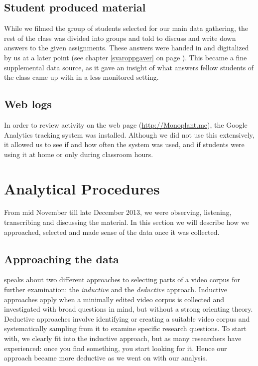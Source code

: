 \subsection{Student produced material}
While we filmed the group of students selected for our main data gathering, the rest of the class was divided into groups and told to discuss and write down answers to the given assignments. These answers were handed in and digitalized by us at a later point (see chapter \ref{svaroppgaver} on page \pageref{svaroppgaver}). This became a fine supplemental data source, as it gave an insight of what answers fellow students of the class came up with in a less monitored setting. 

\subsection{Web logs}
In order to review activity on the web page (\url{http://Monoplant.me}), the Google Analytics tracking system was installed. Although we did not use this extensively, it allowed us to see if and how often the system was used, and if students were using it at home or only during classroom hours. 

\section{Analytical Procedures}
From mid November till late December 2013, we were observing, listening, transcribing and discussing the material. In this section we will describe how we approached, selected and made sense of the data once it was collected.



\subsection{Approaching the data}
\citet{derry2010conducting} speaks about two different approaches to selecting parts of a video corpus for further examination: the \emph{inductive} and the \emph{deductive} approach. Inductive approaches apply when a minimally edited video corpus is collected and investigated with broad questions in mind, but without a strong orienting theory. Deductive approaches involve identifying or creating a suitable video corpus and systematically sampling from it to examine specific research questions. \citep{derry2010conducting} To start with, we clearly fit into the inductive approach, but as many researchers have experienced: once you find something, you start looking for it. Hence our approach became more deductive as we went on with our analysis.

